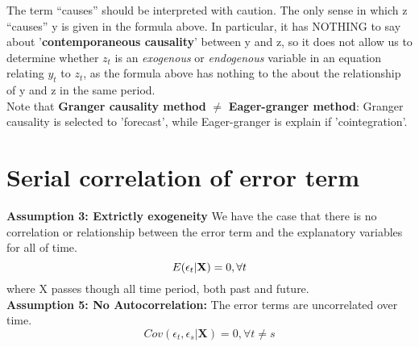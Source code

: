 \documentclass[12pt]{article}
\begin{document}
The term “causes” should be interpreted with caution. The only sense in which z “causes” y is given in the formula above. In particular, it has NOTHING to say about '\textbf{contemporaneous causality}' between y and z, so it does not allow us to determine whether $z_t$ is an \textit{exogenous} or \textit{endogenous} variable in an equation relating $y_t$ to $z_t$, as the formula above has nothing to the about the relationship of y and z in the same period. 
\\

Note that \textbf{Granger causality method} $\ne$ \textbf{Eager-granger method}: Granger causality is selected to 'forecast', while Eager-granger is explain if 'cointegration'. \\



\newpage
{\color{RoyalBlue}
\section{Serial correlation of error term}}
\noindent
\textbf{Assumption 3: Extrictly exogeneity}
We have the case that there is no correlation or relationship between the error term and the explanatory variables for all of time.\\
\begin{equation}
E(\epsilon_t | \textbf{X}) = 0, \forall t  \\
\end{equation}
where X passes though all time period, both past and future.
\\

\noindent
\textbf{Assumption 5: No Autocorrelation:}
The error terms are uncorrelated over time.
\begin{equation}
Cov(\epsilon_t, \epsilon_s|\textbf{X}) = 0, \forall t \ne s
\end{equation}

\\
\end{document}
